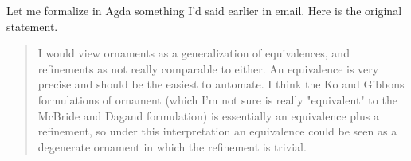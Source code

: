 \documentclass{article}
\begin{document}
Let me formalize in Agda something I'd said earlier in email. Here is
the original statement.

\begin{quote}
 I would view ornaments as a generalization of equivalences, and
 refinements as not really comparable to either. An equivalence is
 very precise and should be the easiest to automate. I think the Ko
 and Gibbons formulations of ornament (which I'm not sure is really
 "equivalent" to the McBride and Dagand formulation) is essentially
 an equivalence plus a refinement, so under this interpretation an
 equivalence could be seen as a degenerate ornament in which the
 refinement is trivial.
\end{quote}

\begin{code}[hide]%
\>[0]\AgdaSymbol{\{{-}\#}\AgdaSpace{}%
\AgdaSpace{}%
\AgdaSpace{}%
\AgdaSpace{}%
\AgdaSymbol{\#{-}\}}\<%
\\
%
\\[\AgdaEmptyExtraSkip]%
\>[0]\AgdaSpace{}%
\AgdaSpace{}%
\<%
\\
%
\\[\AgdaEmptyExtraSkip]%
\>[0]\AgdaSpace{}%
\AgdaSpace{}%
%
\>[50]\AgdaSpace{}%
\AgdaSymbol{(}\AgdaSymbol{;}\AgdaSpace{}%
\AgdaSymbol{;}\AgdaSpace{}%
\AgdaSymbol{;}\AgdaSpace{}%
\AgdaSymbol{)}\<%
\\
\>[0]\AgdaSpace{}%
\AgdaSpace{}%
%
\>[50]\AgdaSpace{}%
\AgdaSymbol{(}\AgdaSymbol{)}\<%
\\
\>[0]\AgdaSpace{}%
\AgdaSpace{}%
%
\>[50]\AgdaSpace{}%
\AgdaSymbol{(}\AgdaSymbol{)}\<%
\\
\>[0]\AgdaSpace{}%
\AgdaSpace{}%
%
\>[50]\AgdaSpace{}%
\AgdaSymbol{(}\AgdaSymbol{)}\<%
\\
\>[0]\AgdaSpace{}%
\AgdaSpace{}%
%
\>[50]\AgdaSpace{}%
\AgdaSymbol{(}\AgdaSymbol{;}\AgdaSpace{}%

\end{code}
\end{document}
